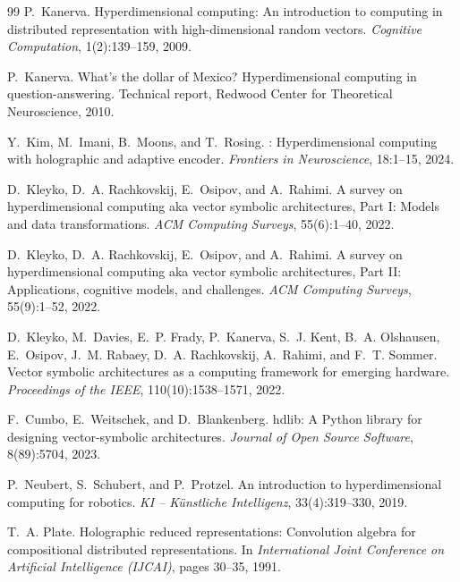 \documentclass[twoside,11pt]{article}
\begin{document}
\begin{thebibliography}{99}
P.~Kanerva.
\newblock Hyperdimensional computing: An introduction to computing in distributed representation with high-dimensional random vectors.
\newblock \textit{Cognitive Computation}, 1(2):139--159, 2009.

P.~Kanerva.
\newblock What's the dollar of {M}exico? {H}yperdimensional computing in question-answering.
\newblock Technical report, Redwood Center for Theoretical Neuroscience, 2010.

Y.~Kim, M.~Imani, B.~Moons, and T.~Rosing.
: Hyperdimensional computing with holographic and adaptive encoder.
\newblock \textit{Frontiers in Neuroscience}, 18:1--15, 2024.

D.~Kleyko, D.~A. Rachkovskij, E.~Osipov, and A.~Rahimi.
\newblock A survey on hyperdimensional computing aka vector symbolic architectures, {P}art {I}: Models and data transformations.
\newblock \textit{ACM Computing Surveys}, 55(6):1--40, 2022.

D.~Kleyko, D.~A. Rachkovskij, E.~Osipov, and A.~Rahimi.
\newblock A survey on hyperdimensional computing aka vector symbolic architectures, {P}art {II}: Applications, cognitive models, and challenges.
\newblock \textit{ACM Computing Surveys}, 55(9):1--52, 2022.

D.~Kleyko, M.~Davies, E.~P. Frady, P.~Kanerva, S.~J. Kent, B.~A. Olshausen, E.~Osipov, J.~M. Rabaey, D.~A. Rachkovskij, A.~Rahimi, and F.~T. Sommer.
\newblock Vector symbolic architectures as a computing framework for emerging hardware.
\newblock \textit{Proceedings of the IEEE}, 110(10):1538--1571, 2022.

F.~Cumbo, E.~Weitschek, and D.~Blankenberg.
\newblock hdlib: A {P}ython library for designing vector-symbolic architectures.
\newblock \textit{Journal of Open Source Software}, 8(89):5704, 2023.

P.~Neubert, S.~Schubert, and P.~Protzel.
\newblock An introduction to hyperdimensional computing for robotics.
\newblock \textit{KI -- K{\"u}nstliche Intelligenz}, 33(4):319--330, 2019.

T.~A. Plate.
\newblock Holographic reduced representations: Convolution algebra for compositional distributed representations.
\newblock In \textit{International Joint Conference on Artificial Intelligence (IJCAI)}, pages 30--35, 1991.


\end{thebibliography}
\end{document}
